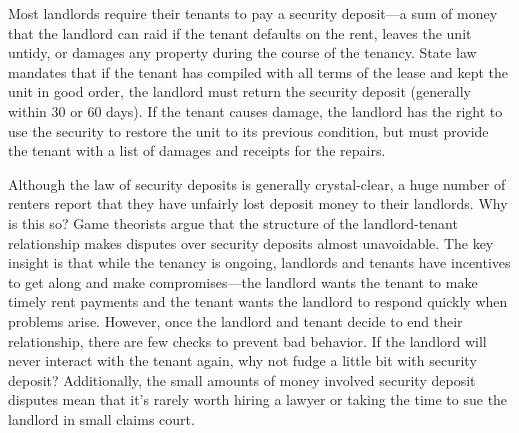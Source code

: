 Most landlords require their tenants to pay a security deposit---a sum of money
that the landlord can raid if the tenant defaults on the rent, leaves the unit
untidy, or damages any property during the course of the tenancy.  State law
mandates that if the tenant has compiled with all terms of the lease and kept
the unit in good order, the landlord must return the security deposit
(generally within 30 or 60 days).  If the tenant causes damage, the landlord
has the right to use the security to restore the unit to its previous
condition, but must provide the tenant with a list of damages and receipts for
the repairs. 

Although the law of security deposits is generally crystal-clear, a huge number
of renters report that they have unfairly lost deposit money to their
landlords.  Why is this so? Game theorists argue that the structure of the
landlord-tenant relationship makes disputes over security deposits almost
unavoidable.  The key insight is that while the tenancy is ongoing, landlords
and tenants have incentives to get along and make compromises---the landlord
wants the tenant to make timely rent payments and the tenant wants the landlord
to respond quickly when problems arise.  However, once the landlord and tenant
decide to end their relationship, there are few checks to prevent bad behavior.
 If the landlord will never interact with the tenant again, why not fudge a
little bit with security deposit?  Additionally, the small amounts of money
involved security deposit disputes mean that it's rarely worth hiring a lawyer
or taking the time to sue the landlord in small claims court. 

